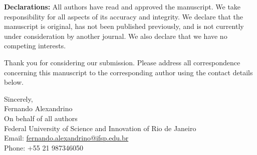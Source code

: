 \documentclass[11pt,a4paper]{article}
\begin{document}
\vspace{0.5mm}
\noindent \textbf{Declarations:} All authors have read and approved the manuscript. We take responsibility for all aspects of its accuracy and integrity. We declare that the manuscript is original, has not been published previously, and is not currently under consideration by another journal. We also declare that we have no competing interests.

\vspace{0.5mm}
\noindent Thank you for considering our submission. Please address all correspondence concerning this manuscript to the corresponding author using the contact details below.

\vspace{1.0em}
\noindent Sincerely,\\[0.6em]
\noindent Fernando Alexandrino\\
On behalf of all authors\\
Federal University of Science and Innovation of Rio de Janeiro\\
Email: \href{mailto:fernando.alexandrino@ifsp.edu.br}{fernando.alexandrino@ifsp.edu.br}\\
Phone: +55 21 987346050
\end{document}
